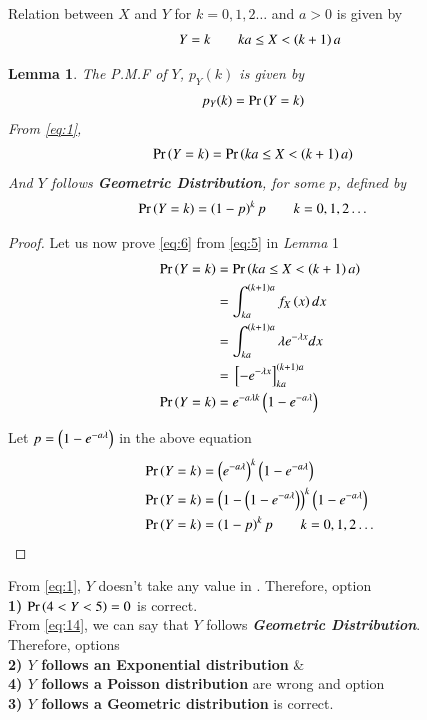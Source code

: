 \documentclass[journal,12pt,twocolumn]{IEEEtran}
\begin{document}
Relation between $X$ and $Y$ for $k=0,1,2\ldots$ and $a>0$ is given by
\begin{align}
    Y=k \qquad ka\leq X < \left(k+1\right)a
\end{align}

\newtheorem{lemma}{Lemma}

\begin{lemma}
    The P.M.F of $Y$, $p_Y(k)$ is given by
    \begin{align}
        p_Y(k) &= \Pr\left(Y=k\right)
    \end{align}
    From \eqref{eq:1},
    \begin{align}
        \label{eq:5}
        \Pr\left(Y=k\right) &= \Pr\left(ka\leq X < \left(k+1\right)a\right)
    \end{align}
    And $Y$ follows \textit{\textbf{Geometric Distribution}}, for some $p$, defined by
    \begin{align}
        \label{eq:6}
        \Pr\left(Y=k\right) &= \left(1-p\right)^kp \qquad k=0,1,2\ldots
    \end{align}
\end{lemma}

\begin{proof}
    Let us now prove \eqref{eq:6} from \eqref{eq:5} in \textit{Lemma} 1
    \begin{align}
        \Pr\left(Y=k\right) &= \Pr\left(ka\leq X < \left(k+1\right)a\right)\\
        &= \int_{ka}^{\left(k+1\right)a}f_X\left(x\right)dx\\
        &= \int_{ka}^{\left(k+1\right)a}\lambda e^{-\lambda x}dx\\
        &= {}\left[-e^{-\lambda x}\right]_{ka}^{\left(k+1\right)a}\\
        \Pr\left(Y=k\right) &= e^{-a\lambda k}\left(1 - e^{-a\lambda}\right)
    \end{align}
    
    Let $p=\left(1-e^{-a\lambda}\right)$ in the above equation
    \begin{align}
        \Pr\left(Y=k\right) &= \left(e^{-a\lambda}\right)^k\left(1-e^{-a\lambda}\right)\\
        \Pr\left(Y=k\right) &= \left(1-\left(1-e^{-a\lambda}\right)\right)^k\left(1-e^{-a\lambda}\right)\\
        \label{eq:14}
        \Pr\left(Y=k\right) &= \left(1-p\right)^kp \qquad k=0,1,2\ldots
    \end{align}
\end{proof}

From \eqref{eq:1}, $Y$ doesn't take any value in .
Therefore, option \\ \textbf{1)} $\Pr\left(4<Y<5\right)=0$ is correct.\\

From \eqref{eq:14}, we can say that $Y$ follows \textit{\textbf{Geometric Distribution}}.\\
Therefore, options\\ \textbf{2) $Y$ follows an Exponential distribution} \& \\ \textbf{4) $Y$ follows a Poisson distribution} are wrong and option \\ \textbf{3) $Y$ follows a Geometric distribution} is correct.
\end{document}

